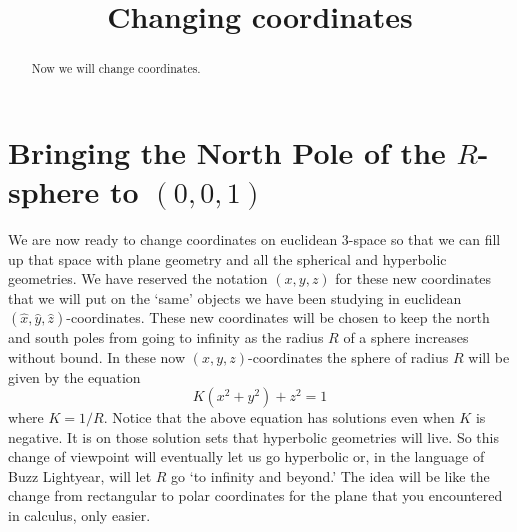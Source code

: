 \documentclass{ximera}
\title{Changing coordinates}
\begin{document}
\begin{abstract}
Now we will change coordinates.
\end{abstract}
\maketitle


\section{Bringing the North Pole of the $R$-sphere to $\left(
0,0,1\right)  $}

We are now ready to change coordinates on euclidean $3$-space so that we can fill up that space  with plane geometry and all the spherical and hyperbolic  geometries.
We have reserved the notation $\left(  x,y,z\right)  $ for these new
coordinates that we will put on the `same' objects we have been studying in
euclidean $\left(  \hat{x},\hat{y},\hat{z}\right)  $-coordinates. These new
coordinates will be chosen to keep the north and south poles from going to
infinity as the radius $R$ of a sphere increases without bound. In these now $\left(  x,y,z\right)  $-coordinates the sphere of radius $R$ will be given by the equation
\[
K(x^{2}+y^{2})+z^{2}=1 
\]
where $K=1/R$. Notice that the above equation has solutions even when $K$ is negative. It is on those solution sets that hyperbolic geometries will live. So this change of
viewpoint will eventually let us go hyperbolic or, in the language of Buzz
Lightyear, will let $R$ go `to infinity and beyond.' The
idea will be like the change from rectangular to polar coordinates for the
plane that you encountered in calculus, only easier. 
\end{document}
